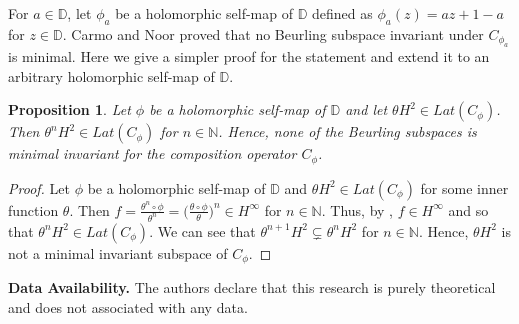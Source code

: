 \documentclass[12pt, reqno]{amsart}
\newtheorem{proposition}[theorem]{Proposition}
\theoremstyle{definition}
\numberwithin{equation}{section}
\begin{document}
For $a \in \mathbb{D}$, let $\phi_a$ be a holomorphic self-map of $\mathbb{D}$ defined as $\phi_a(z)=az+1-a$ for $z \in \mathbb{D}$. Carmo and Noor \cite[Corollary 16]{noor} proved that no Beurling subspace invariant under $C_{\phi_a}$ is minimal. Here we give a simpler proof for the statement and extend it to an arbitrary holomorphic self-map of $\mathbb{D}$.


\begin{proposition}
	Let $\phi$ be a holomorphic self-map of $\mathbb{D}$ and let $\theta H^2 \in Lat(C_\phi)$. Then $\theta^nH^2\in Lat(C_{\phi})$ for $n \in \mathbb{N}$. Hence, none of the Beurling subspaces is minimal invariant for the composition operator $C_\phi$.
\end{proposition}
\begin{proof}
	Let $\phi$  be a holomorphic self-map of $\mathbb{D}$ and $\theta H^2 \in Lat(C_\phi)$ for some inner function $\theta$. Then $f=\frac{\theta^n \circ \phi}{\theta^n} =\Big(\frac{\theta \circ \phi}{\theta}\Big)^n \in H^\infty$ for $n \in \mathbb{N}$. Thus, by \cite[Theorem 2.3]{buerlingtype}, $f  \in H^\infty$ and so that $\theta^nH^2\in Lat(C_{\phi})$. We can see that $\theta^{n+1}H^2\subsetneq \theta^{n}H^2$ for $n \in \mathbb{N}$. Hence, 
	$\theta H^2$ is not a minimal invariant subspace of $C_\phi$.
	
\end{proof}





































{\bf Data Availability.} The authors declare that this research is purely theoretical
and does not associated with any data.
\end{document}
